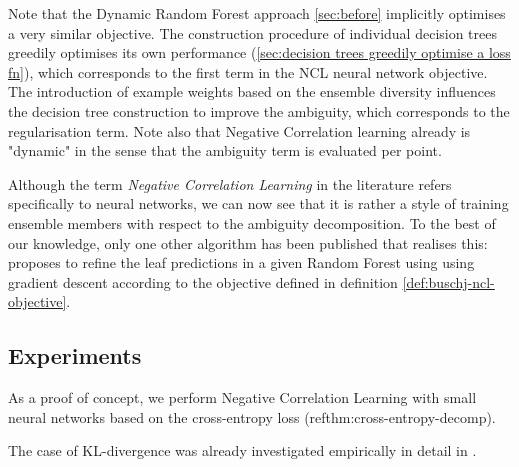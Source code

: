 \documentclass[../main.tex]{subfiles}
\begin{document}
Note that the Dynamic Random Forest approach \ref{sec:before} implicitly optimises a very similar objective. The construction procedure of individual decision trees greedily optimises its own performance (\ref{sec:decision trees greedily optimise a loss fn}), which corresponds to the first term in the NCL neural network objective. The introduction of example weights based on the ensemble diversity influences the decision tree construction to improve the ambiguity, which corresponds to the regularisation term. Note also that Negative Correlation learning already is "dynamic" in the sense that the ambiguity term is evaluated per point. 

Although the term \textit{Negative Correlation Learning} in the literature refers specifically to neural networks, we can now see that it is rather a style of training ensemble members with respect to the ambiguity decomposition.
To the best of our knowledge, only one other algorithm has been published that realises this: \cite{negative-correlation-forests} proposes to refine the leaf predictions in a given Random Forest using using gradient descent according to the objective defined in definition \ref{def:buschj-ncl-objective}.


\subsection{Experiments}


As a proof of concept, we perform Negative Correlation Learning with small neural networks based on the cross-entropy loss (ref{thm:cross-entropy-decomp}).

The case of KL-divergence was already investigated empirically in detail in \cite{Webb}.





\end{document}
